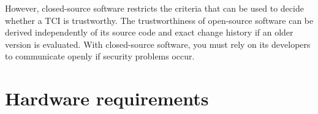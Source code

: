 However, closed-source software restricts the criteria that can be used to decide whether a TCI is trustworthy.
The trustworthiness of open-source software can be derived independently of its source code and exact change history if an older version is evaluated.
With closed-source software, you must rely on its developers to communicate openly if security problems occur.










\section{Hardware requirements}

